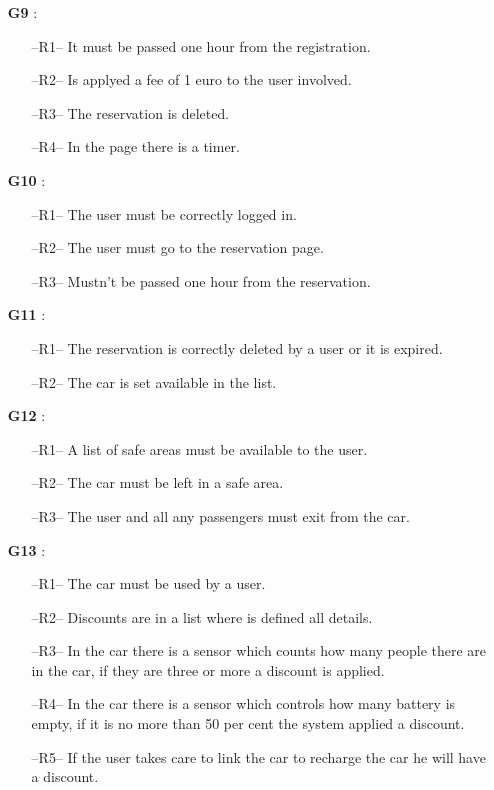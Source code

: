 \begin{itemize}
\item[\textbf{G9}]:
\begin{itemize}
\item[--R1--] It must be passed one hour from the registration.
\item[--R2--] Is applyed a fee of 1 euro to the user involved.
\item[--R3--] The reservation is deleted.
\item[--R4--] In the page there is a timer.
\end{itemize}

\item[\textbf{G10}]:
\begin{itemize}
\item[--R1--] The user must be correctly logged in.
\item[--R2--] The user must go to the reservation page.
\item[--R3--] Mustn't be passed one hour from the reservation.
\end{itemize}

\item[\textbf{G11}]:
\begin{itemize}
\item[--R1--] The reservation is correctly deleted by a user or it is expired. 
\item[--R2--] The car is set available in the list.

\end{itemize}

\item[\textbf{G12}]:
\begin{itemize}
\item[--R1--] A list of safe areas must be available to the user.
\item[--R2--] The car must be left in a safe area.
\item[--R3--] The user and all any passengers must exit from the car.
\end{itemize}

\item[\textbf{G13}]:
\begin{itemize}
\item[--R1--] The car must be used by a user.
\item[--R2--] Discounts are in a list where is defined all details.
\item[--R3--] In the car there is a sensor which counts how many people there are in the car, if they are three or more a discount is applied.
\item[--R4--] In the car there is a sensor which controls how many battery is empty, if it is no more than 50 per cent the system applied a discount.
\item[--R5--] If the user takes care to link the car to recharge the car he will have a discount.
\end{itemize}


\end{itemize}
